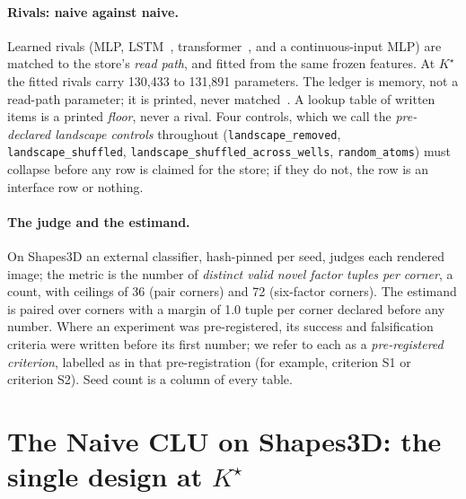 \documentclass{article} %
\newcommand{\Kstar}{\ensuremath{K^{\star}}}
\begin{document}
\paragraph{Rivals: naive against naive.} Learned rivals (MLP, LSTM~\citep{hochreiter1997long}, transformer~\citep{vaswani2017attention}, and a
continuous-input MLP) are matched to the store's \emph{read path}, and fitted from the same
frozen features. At $\Kstar$ the fitted rivals carry 130,433 to 131,891 parameters.
The ledger is memory, not a read-path parameter; it is printed, never matched~\citep{borgeaud2021improving,khandelwal2020generalization,lample2019large}. A lookup table
of written items is a printed \emph{floor}, never a rival. Four controls, which we call the
\emph{pre-declared landscape controls} throughout (\texttt{landscape\_removed}, \texttt{landscape\_shuffled},
\texttt{landscape\_shuffled\_across\_wells}, \texttt{random\_atoms}) must collapse before any
row is claimed for the store; if they do not, the row is an interface row or nothing.

\paragraph{The judge and the estimand.} On Shapes3D an external classifier, hash-pinned per
seed, judges each rendered image; the metric is the number of \emph{distinct valid novel
factor tuples per corner}, a count, with ceilings of 36 (pair corners) and 72 (six-factor
corners). The estimand is paired over corners with a margin of 1.0 tuple per corner declared
before any number. %
Where an experiment was pre-registered, its success and falsification criteria were written before
its first number; we refer to each as a \emph{pre-registered criterion}, labelled as in that
pre-registration (for example, criterion S1 or criterion S2).
Seed count is a column of every table.

\section{The Naive CLU on Shapes3D: the single design at $\Kstar$}
\label{sec:shapes}
\end{document}
